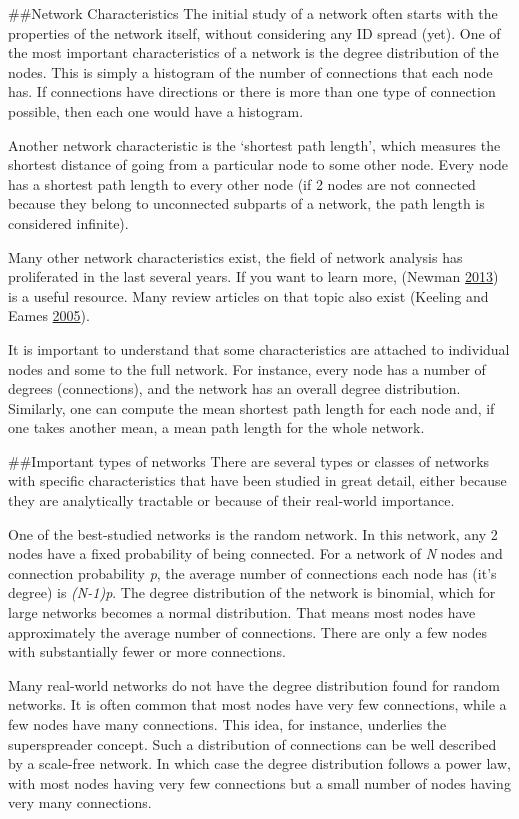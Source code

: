 \documentclass[]{book}
\theoremstyle{definition}
\theoremstyle{definition}
\theoremstyle{definition}
\theoremstyle{remark}
\begin{document}
\#\#Network Characteristics The initial study of a network often starts
with the properties of the network itself, without considering any ID
spread (yet). One of the most important characteristics of a network is
the degree distribution of the nodes. This is simply a histogram of the
number of connections that each node has. If connections have directions
or there is more than one type of connection possible, then each one
would have a histogram.

Another network characteristic is the `shortest path length', which
measures the shortest distance of going from a particular node to some
other node. Every node has a shortest path length to every other node
(if 2 nodes are not connected because they belong to unconnected
subparts of a network, the path length is considered infinite).

Many other network characteristics exist, the field of network analysis
has proliferated in the last several years. If you want to learn more,
(Newman \protect\hyperlink{ref-newman13}{2013}) is a useful resource.
Many review articles on that topic also exist (Keeling and Eames
\protect\hyperlink{ref-keeling05}{2005}).

It is important to understand that some characteristics are attached to
individual nodes and some to the full network. For instance, every node
has a number of degrees (connections), and the network has an overall
degree distribution. Similarly, one can compute the mean shortest path
length for each node and, if one takes another mean, a mean path length
for the whole network.

\#\#Important types of networks There are several types or classes of
networks with specific characteristics that have been studied in great
detail, either because they are analytically tractable or because of
their real-world importance.

One of the best-studied networks is the random network. In this network,
any 2 nodes have a fixed probability of being connected. For a network
of \emph{N} nodes and connection probability \emph{p}, the average
number of connections each node has (it's degree) is \emph{(N-1)p}. The
degree distribution of the network is binomial, which for large networks
becomes a normal distribution. That means most nodes have approximately
the average number of connections. There are only a few nodes with
substantially fewer or more connections.

Many real-world networks do not have the degree distribution found for
random networks. It is often common that most nodes have very few
connections, while a few nodes have many connections. This idea, for
instance, underlies the superspreader concept. Such a distribution of
connections can be well described by a scale-free network. In which case
the degree distribution follows a power law, with most nodes having very
few connections but a small number of nodes having very many
connections.
\end{document}

